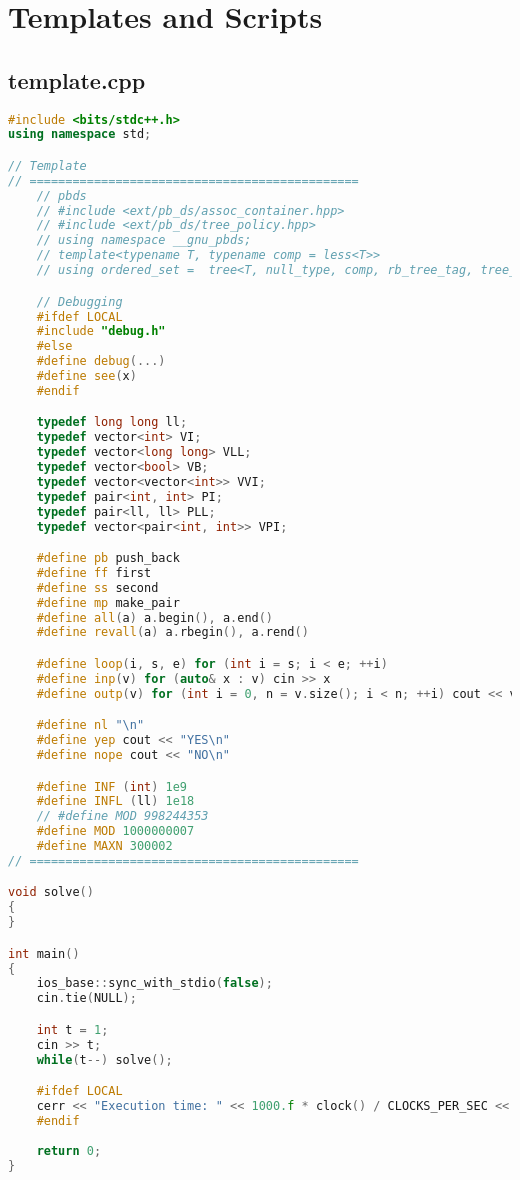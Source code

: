 \chapter{Templates and Scripts}

\section{template.cpp}
\begin{lstlisting}[language=C++]
#include <bits/stdc++.h>
using namespace std;

// Template
// ==============================================
    // pbds
    // #include <ext/pb_ds/assoc_container.hpp>
    // #include <ext/pb_ds/tree_policy.hpp>
    // using namespace __gnu_pbds;
    // template<typename T, typename comp = less<T>>
    // using ordered_set =  tree<T, null_type, comp, rb_tree_tag, tree_order_statistics_node_update>;

    // Debugging
    #ifdef LOCAL
    #include "debug.h"
    #else
    #define debug(...)
    #define see(x)
    #endif

    typedef long long ll;
    typedef vector<int> VI;
    typedef vector<long long> VLL;
    typedef vector<bool> VB;
    typedef vector<vector<int>> VVI;
    typedef pair<int, int> PI;
    typedef pair<ll, ll> PLL;
    typedef vector<pair<int, int>> VPI;

    #define pb push_back
    #define ff first
    #define ss second
    #define mp make_pair
    #define all(a) a.begin(), a.end()
    #define revall(a) a.rbegin(), a.rend()

    #define loop(i, s, e) for (int i = s; i < e; ++i)
    #define inp(v) for (auto& x : v) cin >> x
    #define outp(v) for (int i = 0, n = v.size(); i < n; ++i) cout << v[i] << " \n"[i == n - 1]

    #define nl "\n"
    #define yep cout << "YES\n"
    #define nope cout << "NO\n"

    #define INF (int) 1e9
    #define INFL (ll) 1e18
    // #define MOD 998244353
    #define MOD 1000000007
    #define MAXN 300002
// ==============================================

void solve()
{   
}

int main()
{
    ios_base::sync_with_stdio(false);
    cin.tie(NULL);

    int t = 1;
    cin >> t;
    while(t--) solve();

    #ifdef LOCAL
    cerr << "Execution time: " << 1000.f * clock() / CLOCKS_PER_SEC << " ms." << nl;
    #endif
    
    return 0;
}
\end{lstlisting}
\sectionend

